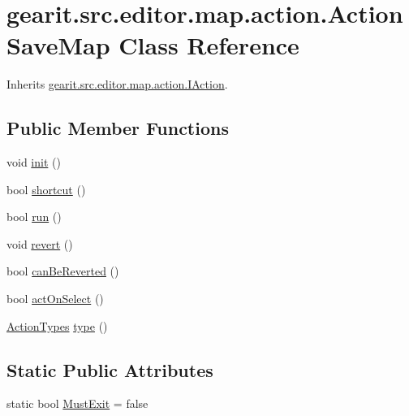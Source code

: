\hypertarget{classgearit_1_1src_1_1editor_1_1map_1_1action_1_1_action_save_map}{\section{gearit.\+src.\+editor.\+map.\+action.\+Action\+Save\+Map Class Reference}
\label{classgearit_1_1src_1_1editor_1_1map_1_1action_1_1_action_save_map}
}


Inherits \hyperlink{interfacegearit_1_1src_1_1editor_1_1map_1_1action_1_1_i_action}{gearit.\+src.\+editor.\+map.\+action.\+I\+Action}.

\subsection*{Public Member Functions}
\begin{DoxyCompactItemize}
\item 
void \hyperlink{classgearit_1_1src_1_1editor_1_1map_1_1action_1_1_action_save_map_a9ae629b2dd6d6fd9ab09f4a13b2753c9}{init} ()
\item 
bool \hyperlink{classgearit_1_1src_1_1editor_1_1map_1_1action_1_1_action_save_map_ac69626a159b25c02e845a26b8edec66b}{shortcut} ()
\item 
bool \hyperlink{classgearit_1_1src_1_1editor_1_1map_1_1action_1_1_action_save_map_aede130e46e4bb891026fc7535be5b5b0}{run} ()
\item 
void \hyperlink{classgearit_1_1src_1_1editor_1_1map_1_1action_1_1_action_save_map_a49005e5973d6154176484a14051c4f9a}{revert} ()
\item 
bool \hyperlink{classgearit_1_1src_1_1editor_1_1map_1_1action_1_1_action_save_map_a9f692092030ce67d9e1acc3e8e7e0b7d}{can\+Be\+Reverted} ()
\item 
bool \hyperlink{classgearit_1_1src_1_1editor_1_1map_1_1action_1_1_action_save_map_ad51a755c845d470fe67aa2fb45f994ad}{act\+On\+Select} ()
\item 
\hyperlink{namespacegearit_1_1src_1_1editor_1_1map_1_1action_af036712a7d960b13d1e31954e65c00e3}{Action\+Types} \hyperlink{classgearit_1_1src_1_1editor_1_1map_1_1action_1_1_action_save_map_aa9d1ea6720b67904aa53af236665e218}{type} ()
\end{DoxyCompactItemize}
\subsection*{Static Public Attributes}
\begin{DoxyCompactItemize}
\item 
static bool \hyperlink{classgearit_1_1src_1_1editor_1_1map_1_1action_1_1_action_save_map_a1021f2d682e8f98448394716e5ecb782}{Must\+Exit} = false
\end{DoxyCompactItemize}


